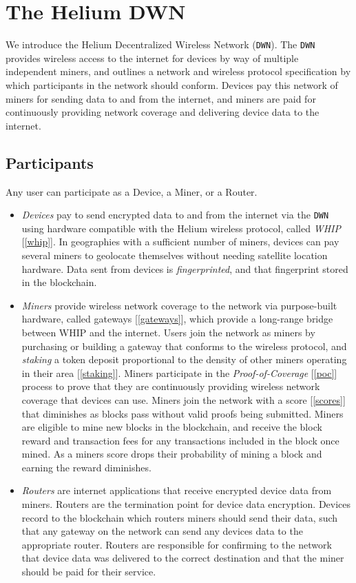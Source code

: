 \documentclass[letterpaper,11pt]{article}
\begin{document}
\section{The Helium DWN}

We introduce the Helium Decentralized Wireless Network (\verb|DWN|). The \verb|DWN| provides wireless access to the internet for devices by way of multiple independent miners, and outlines a network and wireless protocol specification by which participants in the network should conform. Devices pay this network of miners for sending data to and from the internet, and miners are paid for continuously providing network coverage and delivering device data to the internet.

\subsection{Participants}

Any user can participate as a Device, a Miner, or a Router.

\begin{itemize}
    \item \emph{Devices} pay to send encrypted data to and from the internet via the \verb|DWN| using hardware compatible with the Helium wireless protocol, called \emph{WHIP} [\ref{whip}]. In geographies with a sufficient number of miners, devices can pay several miners to geolocate themselves without needing satellite location hardware. Data sent from devices is \emph{fingerprinted}, and that fingerprint stored in the blockchain.
    \item \emph{Miners} provide wireless network coverage to the network via purpose-built hardware, called gateways [\ref{gateways}], which provide a long-range bridge between WHIP and the internet. Users join the network as miners by purchasing or building a gateway that conforms to the wireless protocol, and \emph{staking} a token deposit proportional to the density of other miners operating in their area [\ref{staking}]. Miners participate in the \emph{Proof-of-Coverage} [\ref{poc}] process to prove that they are continuously providing wireless network coverage that devices can use. Miners join the network with a score [\ref{scores}] that diminishes as blocks pass without valid proofs being submitted. Miners are eligible to mine new blocks in the blockchain, and receive the block reward and transaction fees for any transactions included in the block once mined. As a miners score drops their probability of mining a block and earning the reward diminishes.
    \item \emph{Routers} are internet applications that receive encrypted device data from miners. Routers are the termination point for device data encryption. Devices record to the blockchain which routers miners should send their data, such that any gateway on the network can send any devices data to the appropriate router. Routers are responsible for confirming to the network that device data was delivered to the correct destination and that the miner should be paid for their service.
\end{itemize}
\end{document}
